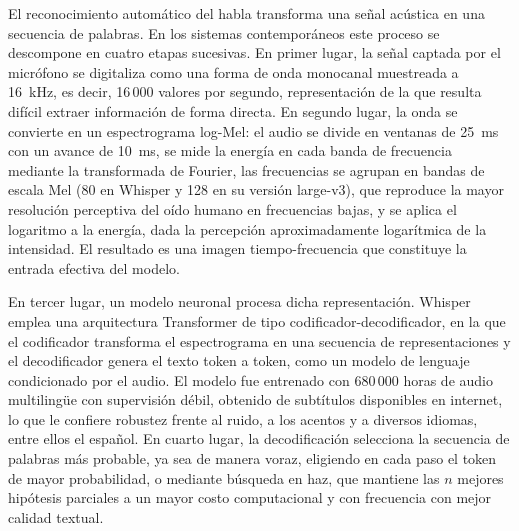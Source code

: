 \documentclass[11pt,a4paper]{article}
\begin{document}
El reconocimiento automático del habla transforma una señal acústica en una secuencia de palabras. En los sistemas contemporáneos este proceso se descompone en cuatro etapas sucesivas. En primer lugar, la señal captada por el micrófono se digitaliza como una forma de onda monocanal muestreada a 16~kHz, es decir, 16\,000 valores por segundo, representación de la que resulta difícil extraer información de forma directa. En segundo lugar, la onda se convierte en un espectrograma log-Mel: el audio se divide en ventanas de 25~ms con un avance de 10~ms, se mide la energía en cada banda de frecuencia mediante la transformada de Fourier, las frecuencias se agrupan en bandas de escala Mel (80 en Whisper y 128 en su versión large-v3), que reproduce la mayor resolución perceptiva del oído humano en frecuencias bajas, y se aplica el logaritmo a la energía, dada la percepción aproximadamente logarítmica de la intensidad. El resultado es una imagen tiempo-frecuencia que constituye la entrada efectiva del modelo.

En tercer lugar, un modelo neuronal procesa dicha representación. Whisper \cite{radford2023} emplea una arquitectura Transformer de tipo codificador-decodificador, en la que el codificador transforma el espectrograma en una secuencia de representaciones y el decodificador genera el texto token a token, como un modelo de lenguaje condicionado por el audio. El modelo fue entrenado con 680\,000 horas de audio multilingüe con supervisión débil, obtenido de subtítulos disponibles en internet, lo que le confiere robustez frente al ruido, a los acentos y a diversos idiomas, entre ellos el español. En cuarto lugar, la decodificación selecciona la secuencia de palabras más probable, ya sea de manera voraz, eligiendo en cada paso el token de mayor probabilidad, o mediante búsqueda en haz, que mantiene las $n$ mejores hipótesis parciales a un mayor costo computacional y con frecuencia con mejor calidad textual.
\end{document}
